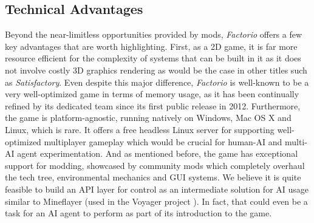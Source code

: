 \subsection{Technical Advantages}
Beyond the near-limitless opportunities provided by mods, \textit{Factorio} offers a few key advantages that are worth highlighting. First, as a 2D game, it is far more resource efficient for the complexity of systems that can be built in it as it does not involve costly 3D graphics rendering as would be the case in other titles such as \textit{Satisfactory}. Even despite this major difference, \textit{Factorio} is well-known to be a very well-optimized game in terms of memory usage, as it has been continually refined by its dedicated team since its first public release in 2012. Furthermore, the game is platform-agnostic, running natively on Windows, Mac OS X and Linux, which is rare. It offers a free headless Linux server for supporting well-optimized multiplayer gameplay which would be crucial for human-AI and multi-AI agent experimentation. And as mentioned before, the game has exceptional support for modding, showcased by community mods which completely overhaul the tech tree, environmental mechanics and GUI systems. We believe it is quite feasible to build an API layer for control as an intermediate solution for AI usage similar to Mineflayer \cite{mineflayer2024} (used in the Voyager project \cite{wang2023voyager}). In fact, that could even be a task for an AI agent to perform as part of its introduction to the game.